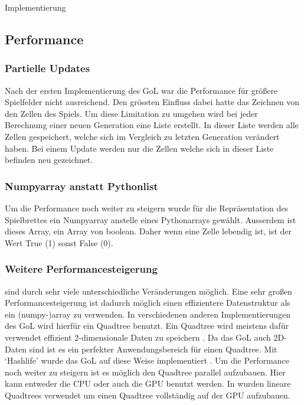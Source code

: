\documentclass[runningheads]{llncs}
\begin{document}
\begin{section}{Implementierung}
    \subsection{Performance}

    \subsubsection{Partielle Updates}
        Nach der ersten Implementierung des GoL war die Performance für größere Spielfelder nicht ausreichend.
        Den grössten Einfluss dabei hatte das Zeichnen von den Zellen des Spiels.
        Um diese Limitation zu umgehen wird bei jeder Berechnung einer neuen Generation eine Liste erstellt.
        In dieser Liste werden alle Zellen gespeichert, welche sich im Vergleich zu letzten Generation verändert haben.
        Bei einem Update werden nur die Zellen welche sich in dieser Liste befinden neu gezeichnet.

    \subsubsection{Numpyarray anstatt Pythonlist}
        Um die Performance noch weiter zu steigern wurde für die Repräsentation des Spielbrettes ein Numpyarray anstelle eines Pythonarrays gewählt.
        Ausserdem ist dieses Array, ein Array von boolean. 
        Daher wenn eine Zelle lebendig ist, ist der Wert True (1) sonst False (0).
    
    \subsubsection{Weitere Performancesteigerung}
        sind durch sehr viele unterschiedliche Veränderungen möglich.
        Eine sehr großen Performancesteigerung ist dadurch möglich einen effizientere Datenstruktur als ein (numpy-)array zu verwenden.
        In verschiedenen anderen Implementierungen des GoL wird hierfür ein Quadtree benutzt.
        Ein Quadtree wird meistens dafür verwendet effizient 2-dimensionale Daten zu speichern \cite{quadtreeGeeksForGeeks}.
        Da das GoL auch 2D-Daten sind ist es ein perfekter Anwendungsbereich für einen Quadtree.
        Mit `Hashlife' wurde das GoL auf diese Weise implementiert \cite{haslifeWiki}. \newline
        Um die Performance noch weiter zu steigern ist es möglich den Quadtree parallel aufzubauen.
        Hier kann entweder die CPU oder auch die GPU benutzt werden.
        In \cite{quadtreesOnGPU} wurden lineare Quadtrees verwendet um einen Quadtree vollständig auf der GPU aufzubauen.
       

\end{section}
\end{document}
